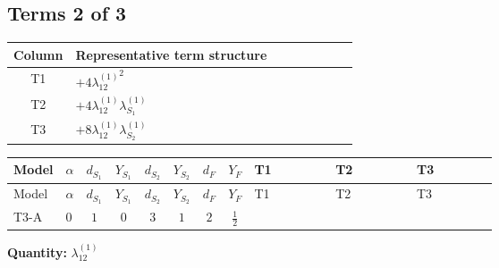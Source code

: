 \documentclass[8pt]{article}
\begin{document}
\begin{landscape}
\subsection*{Terms 2 of 3}
\begin{center}
\begin{tabular}{@{}c >{\raggedright\arraybackslash}p{0.82\linewidth}@{}}
\toprule
Column & Representative term structure \\
\midrule
T1 & \(\displaystyle +4 {\lambda_{12}^{(1)}}^2\) \\
\midrule
T2 & \(\displaystyle +4 {\lambda_{12}^{(1)}} {\lambda_{S_1}^{(1)}}\) \\
\midrule
T3 & \(\displaystyle +8 {\lambda_{12}^{(1)}} {\lambda_{S_2}^{(1)}}\) \\
\midrule
\bottomrule
\end{tabular}
\end{center}
\smallskip
\tiny
\begin{longtable}{@{}llcccccc >{\raggedright\arraybackslash}p{0.21\linewidth} >{\raggedright\arraybackslash}p{0.21\linewidth} >{\raggedright\arraybackslash}p{0.21\linewidth}@{}}
\toprule
Model & $\alpha$ & $d_{S_1}$ & $Y_{S_1}$ & $d_{S_2}$ & $Y_{S_2}$ & $d_F$ & $Y_F$ & T1 & T2 & T3 \\
\midrule
\endfirsthead
\toprule
Model & $\alpha$ & $d_{S_1}$ & $Y_{S_1}$ & $d_{S_2}$ & $Y_{S_2}$ & $d_F$ & $Y_F$ & T1 & T2 & T3 \\
\midrule
\endhead
T3-A & $0$ & $1$ & $0$ & $3$ & $1$ & $2$ & $\frac{1}{2}$ & \scriptsize\adjustbox{max width=\linewidth}{$\begin{gathered} +4 {\lambda_{12}^{(1)}}^2\end{gathered}$} & \scriptsize\adjustbox{max width=\linewidth}{$\begin{gathered} +4 {\lambda_{12}^{(1)}} {\lambda_{S_1}^{(1)}}\end{gathered}$} & \scriptsize\adjustbox{max width=\linewidth}{$\begin{gathered} +8 {\lambda_{12}^{(1)}} {\lambda_{S_2}^{(1)}}\end{gathered}$} \\
\midrule
\bottomrule
\end{longtable}
\clearpage
\noindent\textbf{Quantity: }$\lambda_{12}^{(1)}$\par\smallskip

\end{landscape}
\end{document}

